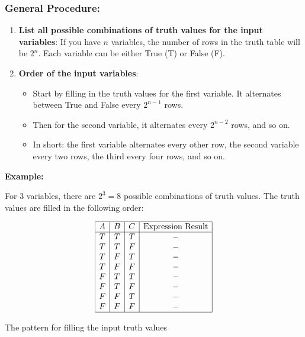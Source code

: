 \subsubsection{General Procedure:}
\begin{enumerate}
	\item \textbf{List all possible combinations of truth values for the input variables}: If you have \(n\) variables, the number of rows in the truth table will be \(2^n\). Each variable can be either True (T) or False (F).

	\item \textbf{Order of the input variables}:
	      \begin{itemize}
		      \item Start by filling in the truth values for the first variable. It alternates between True and False every \(2^{n-1}\) rows.
		      \item Then for the second variable, it alternates every \(2^{n-2}\) rows, and so on.
		      \item In short: the first variable alternates every other row, the second variable every two rows, the third every four rows, and so on.
	      \end{itemize}
\end{enumerate}

\textbf{Example: } 
\vspace{\baselineskip}

For 3 variables, there are \(2^3 = 8\) possible combinations of truth values. The truth values are filled in the following order:

\[
	\begin{array}{|c|c|c|c|}
		\hline
		A & B & C & \text{Expression Result} \\
		\hline
		T & T & T &       -                  \\
		T & T & F &       -                  \\
		T & F & T &       -                  \\
		T & F & F &       -                  \\
		F & T & T &       -                  \\
		F & T & F &       -                  \\
		F & F & T &       -                  \\
		F & F & F &       -                  \\
		\hline
	\end{array}
\]

The pattern for filling the input truth values


